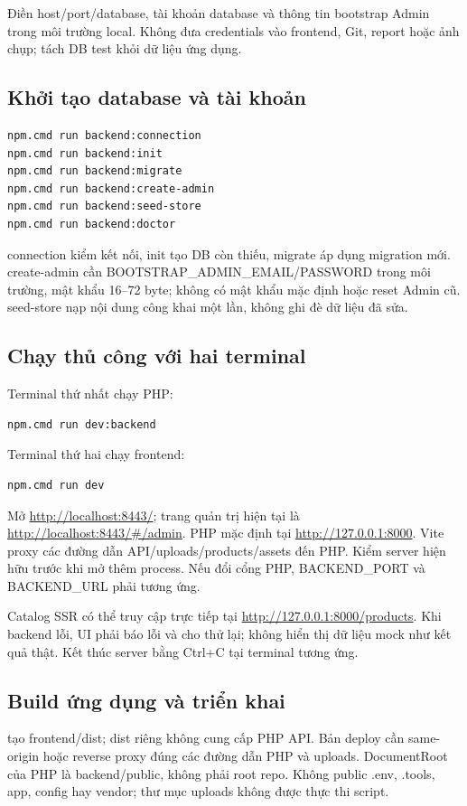 Điền host/port/database, tài khoản database và thông tin bootstrap Admin trong môi trường local. Không đưa credentials vào frontend, Git, report hoặc ảnh chụp; tách DB test khỏi dữ liệu ứng dụng.

\subsection{Khởi tạo database và tài khoản}
\begin{lstlisting}[caption={Các bước khởi tạo theo README}]
npm.cmd run backend:connection
npm.cmd run backend:init
npm.cmd run backend:migrate
npm.cmd run backend:create-admin
npm.cmd run backend:seed-store
npm.cmd run backend:doctor
\end{lstlisting}
connection kiểm kết nối, init tạo DB còn thiếu, migrate áp dụng migration mới. create-admin cần BOOTSTRAP\_ADMIN\_EMAIL/PASSWORD trong môi trường, mật khẩu 16–72 byte; không có mật khẩu mặc định hoặc reset Admin cũ. seed-store nạp nội dung công khai một lần, không ghi đè dữ liệu đã sửa.

\subsection{Chạy thủ công với hai terminal}
Terminal thứ nhất chạy PHP:
\begin{lstlisting}
npm.cmd run dev:backend
\end{lstlisting}
Terminal thứ hai chạy frontend:
\begin{lstlisting}
npm.cmd run dev
\end{lstlisting}
Mở \url{http://localhost:8443/}; trang quản trị hiện tại là \url{http://localhost:8443/\#/admin}. PHP mặc định tại \url{http://127.0.0.1:8000}. Vite proxy các đường dẫn API/uploads/products/assets đến PHP. Kiểm server hiện hữu trước khi mở thêm process. Nếu đổi cổng PHP, BACKEND\_PORT và BACKEND\_URL phải tương ứng.

Catalog SSR có thể truy cập trực tiếp tại \url{http://127.0.0.1:8000/products}. Khi backend lỗi, UI phải báo lỗi và cho thử lại; không hiển thị dữ liệu mock như kết quả thật. Kết thúc server bằng Ctrl+C tại terminal tương ứng.

\subsection{Build ứng dụng và triển khai}
 tạo frontend/dist; dist riêng không cung cấp PHP API. Bản deploy cần same-origin hoặc reverse proxy đúng các đường dẫn PHP và uploads. DocumentRoot của PHP là backend/public, không phải root repo. Không public .env, .tools, app, config hay vendor; thư mục uploads không được thực thi script.

